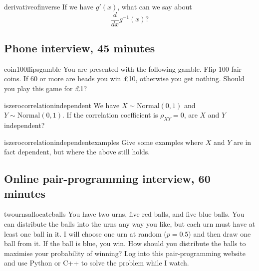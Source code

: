 \documentclass[a4paper]{article}
\begin{document}
\begin{question}{derivativeofinverse}
If we have  $g'(x)$,
what can we say about
\[
\frac{d}{dx} g^{-1}(x)
\text{?}
\]

\end{question}

\clearpage




\clearpage
\subsection{Phone interview, 45 minutes}
\begin{question}{coin100flipsgamble}
You are presented with the following gamble.
Flip 100 fair coins.
If 60 or more are heads you win \pounds 10, otherwise you get nothing.
Should you play this game for \pounds 1?
\end{question}

\begin{question}{iszerocorrelationindependent}
We have $X \sim \text{Normal}(0,1)$ and $Y \sim \text{Normal}(0,1)$.
If the correlation coefficient is $\rho_{XY}=0$, are $X$ and $Y$ independent?
\end{question}


\begin{question}{iszerocorrelationindependentexamples}
Give some examples where $X$ and $Y$ are in fact dependent, but where the above still holds.
\end{question}

\clearpage





\clearpage
\subsection{Online pair-programming interview, 60 minutes}
\begin{question}{twournsallocateballs}
You have two urns, five red balls, and five blue balls.
You can distribute the balls into the urns any way you like, but each urn must have at least one ball in it.
I will choose one urn at random ($p=0.5$) and then draw one ball from it.
If the ball is blue, you win.
How should you distribute the balls to maximise your probability of winning?
Log into this pair-programming website and use Python or C++ to solve the problem while I watch.
\end{question}
\end{document}
